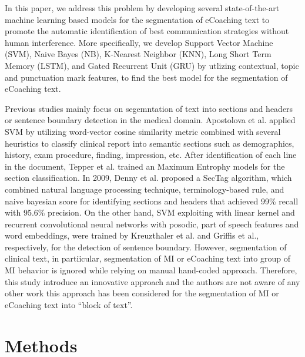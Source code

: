 \documentclass{amia}
\begin{document}
In this paper, we address this problem by developing several state-of-the-art machine learning based models for the segmentation of eCoaching text to promote the automatic identification of best communication strategies without human interference. More specifically, we develop Support Vector Machine (SVM), Naive Bayes (NB), K-Nearest Neighbor (KNN), Long Short Term Memory (LSTM), and Gated Recurrent Unit (GRU) by utlizing contextual, topic and punctuation mark features, to find the best model for the segmentation of eCoaching text. 

Previous studies mainly focus on segemntation of text into sections and headers\cite{apostolova2009automatic,denny2009evaluation,tepper2012statistical,cho2002text} or sentence boundary detection\cite{griffis2016quantitative,kreuzthaler2015detection,treviso2016sentence} in the medical domain. Apostolova et al.\cite{apostolova2009automatic} applied SVM by utilizing word-vector cosine similarity metric combined with several heuristics to classify clinical report into semantic sections such as demographics, history, exam procedure, finding, impression, etc. After identification of each line in the document, Tepper et al. \cite{tepper2012statistical} trained an Maximum Entrophy models for the section classification. In 2009, Denny et al.\cite{denny2009evaluation} proposed a SecTag algorithm, which combined natural language processing technique, terminology-based rule, and naive bayesian score for identifying sections and headers that achieved 99\% recall with 95.6\% precision. On the other hand, SVM exploiting with linear kernel and recurrent convolutional neural networks with posodic, part of speech features and word embeddings, were trained by Kreuzthaler et al.\cite{kreuzthaler2015detection} and Griffis et al.\cite{griffis2016quantitative}, respectively, for the detection of sentence boundary. However, segmentation of clinical text, in partiicular, segmentation of MI or eCoaching text into group of MI behavior is ignored while relying on manual hand-coded approach. Therefore, this study introduce an innovative approach and the authors are not aware of any other work this approach has been considered for the segmentation of MI or eCoaching text into ``block of text''. 

\section*{Methods}
\end{document}
